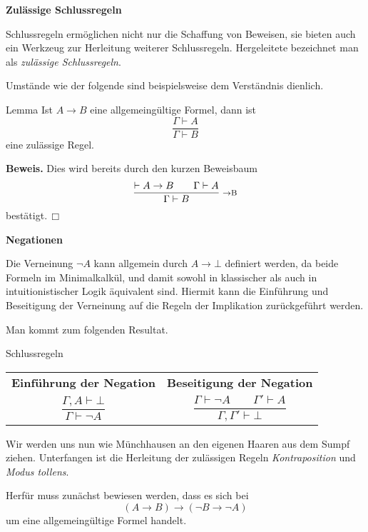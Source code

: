 \documentclass[8pt]{beamer}
\newcommand{\strong}[1]{\textsf{\textbf{#1}}}
\newcommand{\infernote}[1]{\!\text{\footnotesize #1}}
\renewcommand{\qedsymbol}{\ensuremath{\Box}}
\newcommand{\centerheadline}[1]{%
  \begin{center}\strong{#1}\end{center}}
\newcommand{\parspace}{\vspace{0.8em}}
\newcommand{\cond}{\rightarrow}
\begin{document}
\begin{frame}
\centerheadline{Zulässige Schlussregeln}
\end{frame}

\begin{frame}
Schlussregeln ermöglichen nicht nur die Schaffung von Beweisen,
sie bieten auch ein Werkzeug zur Herleitung weiterer Schlussregeln.
Hergeleitete bezeichnet man als \emph{zulässige Schlussregeln}.\pause{}

\parspace
Umstände wie der folgende sind beispielsweise
dem Verständnis dienlich.

\begin{block}{Lemma}
Ist $A\cond B$ eine allgemeingültige
Formel, dann ist
\[\dfrac{\Gamma\vdash A}{\Gamma\vdash B}\]
eine zulässige Regel.
\end{block}\pause

\parspace
\strong{Beweis.} Dies wird bereits durch den kurzen Beweisbaum
\[\dfrac{\vdash A\cond B\qquad \Gamma\vdash A}{
  \Gamma\vdash B}\;\,\infernote{$\cond$B}\]
bestätigt.\,\qedsymbol
\end{frame}

\begin{frame}
\centerheadline{Negationen}
\end{frame}

\begin{frame}
Die Verneinung $\neg A$ kann allgemein durch $A\cond\bot$
definiert werden, da beide Formeln im Minimalkalkül, und damit sowohl
in klassischer als auch in intuitionistischer Logik äquivalent sind.
Hiermit kann die Einführung und Beseitigung der Verneinung auf die
Regeln der Implikation zurückgeführt werden.\pause

\parspace
Man kommt zum folgenden Resultat.
\begin{block}{Schlussregeln}
\begin{center}
\begin{tabular}{c@{\qquad\quad}c}
\strong{\small Einführung der Negation}
& \strong{\small Beseitigung der Negation}\\[6pt]
$\dfrac{\Gamma,A\vdash\bot}{\Gamma\vdash\neg A}$
& $\dfrac{\Gamma\vdash\neg A\qquad\Gamma'\vdash A}{\Gamma,\Gamma'\vdash\bot}$\\
\end{tabular}
\end{center}
\end{block}
\end{frame}

\begin{frame}
Wir werden uns nun wie Münchhausen an den eigenen Haaren aus dem
Sumpf ziehen. Unterfangen ist die Herleitung der zulässigen Regeln
\emph{Kontraposition} und \emph{Modus tollens}.\pause

\parspace
Herfür muss zunächst bewiesen werden, dass es sich bei
\[(A\cond B)\cond (\neg B\cond\neg A)\]
um eine allgemeingültige Formel handelt.
\end{frame}
\end{document}
